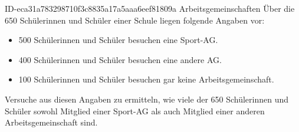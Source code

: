 \begin{exercise}
      {ID-eca31a783298710f3c8835a17a5aaa6eef81809a}
      {Arbeitsgemeinschaften}
  \ifproblem\problem
    Über die 650 Schülerinnen und Schüler einer Schule liegen folgende Angaben
    vor:
    \begin{itemize}
      \squeeze
      \item 500 Schülerinnen und Schüler besuchen eine Sport-AG.
      \item 400 Schülerinnen und Schüler besuchen eine andere AG.
      \item 100 Schülerinnen und Schüler besuchen gar keine Arbeitsgemeinschaft.
    \end{itemize}
    Versuche aus diesen Angaben zu ermitteln, wie viele der 650 Schülerinnen
    und Schüler sowohl Mitglied einer Sport-AG als auch Mitglied einer anderen
    Arbeitsgemeinschaft sind.
  \fi
\end{exercise}
